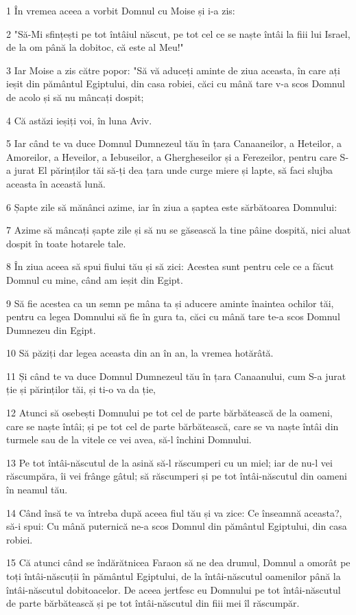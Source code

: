 \par 1 În vremea aceea a vorbit Domnul cu Moise și i-a zis:
\par 2 "Să-Mi sfințești pe tot întâiul născut, pe tot cel ce se naște întâi la fiii lui Israel, de la om până la dobitoc, că este al Meu!"
\par 3 Iar Moise a zis către popor: "Să vă aduceți aminte de ziua aceasta, în care ați ieșit din pământul Egiptului, din casa robiei, căci cu mână tare v-a scos Domnul de acolo și să nu mâncați dospit;
\par 4 Că astăzi ieșiți voi, în luna Aviv.
\par 5 Iar când te va duce Domnul Dumnezeul tău în țara Canaaneilor, a Heteilor, a Amoreilor, a Heveilor, a Iebuseilor, a Ghergheseilor și a Ferezeilor, pentru care S-a jurat El părinților tăi să-ți dea țara unde curge miere și lapte, să faci slujba aceasta în această lună.
\par 6 Șapte zile să mănânci azime, iar în ziua a șaptea este sărbătoarea Domnului:
\par 7 Azime să mâncați șapte zile și să nu se găsească la tine pâine dospită, nici aluat dospit în toate hotarele tale.
\par 8 În ziua aceea să spui fiului tău și să zici: Acestea sunt pentru cele ce a făcut Domnul cu mine, când am ieșit din Egipt.
\par 9 Să fie acestea ca un semn pe mâna ta și aducere aminte înaintea ochilor tăi, pentru ca legea Domnului să fie în gura ta, căci cu mână tare te-a scos Domnul Dumnezeu din Egipt.
\par 10 Să păziți dar legea aceasta din an în an, la vremea hotărâtă.
\par 11 Și când te va duce Domnul Dumnezeul tău în țara Canaanului, cum S-a jurat ție și părinților tăi, și ti-o va da ție,
\par 12 Atunci să osebești Domnului pe tot cel de parte bărbătească de la oameni, care se naște întâi; și pe tot cel de parte bărbătească, care se va naște întâi din turmele sau de la vitele ce vei avea, să-l închini Domnului.
\par 13 Pe tot întâi-născutul de la asină să-l răscumperi cu un miel; iar de nu-l vei răscumpăra, îi vei frânge gâtul; să răscumperi și pe tot întâi-născutul din oameni în neamul tău.
\par 14 Când însă te va întreba după aceea fiul tău și va zice: Ce înseamnă aceasta?, să-i spui: Cu mână puternică ne-a scos Domnul din pământul Egiptului, din casa robiei.
\par 15 Că atunci când se îndărătnicea Faraon să ne dea drumul, Domnul a omorât pe toți întâi-născuții în pământul Egiptului, de la întâi-născutul oamenilor până la întâi-născutul dobitoacelor. De aceea jertfesc eu Domnului pe tot întâi-născutul de parte bărbătească și pe tot întâi-născutul din fiii mei îl răscumpăr.

